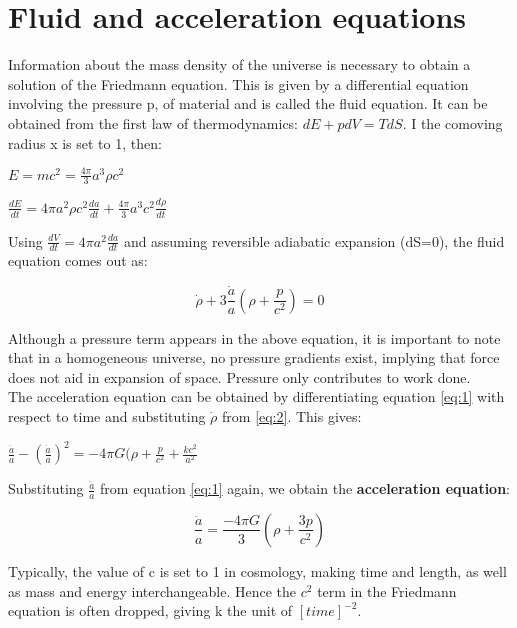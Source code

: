 \documentclass{beamer}
\begin{document}
\section{Fluid and acceleration equations}
\begin{frame}[allowframebreaks]

Information about the mass density of the universe is necessary to obtain a solution of the Friedmann equation. This is given by a differential equation involving the pressure p, of material and is called the fluid equation. It can be obtained from the first law of thermodynamics: $dE+pdV = TdS $. I the comoving radius x is set to 1, then:

\begin{center}
    $E = mc^2 = \frac{4\pi}{3}a^3{\rho}c^2$ \\
\end{center}
    
\begin{center}    
    $\frac{dE}{dt} = 4{\pi}a^2{\rho}c^2\frac{da}{dt}+\frac{4\pi}{3}a^3c^2\frac{d\rho}{dt}$
\end{center}

Using $\frac{dV}{dt} = 4{\pi}a^2\frac{da}{dt}$ and assuming reversible adiabatic expansion (dS=0), the fluid equation comes out as:

\begin{equation} \label{eq:2}
    \dot{\rho}+3\frac{\dot{a}}{a}(\rho+\frac{p}{c^2})=0
\end{equation}

Although a pressure term appears in the above equation, it is important to note that in a homogeneous universe, no pressure gradients exist, implying that force does not aid in expansion of space. Pressure only contributes to work done.
\\
The acceleration equation can be obtained by differentiating equation \ref{eq:1} with respect to time and substituting $\dot{\rho}$ from \ref{eq:2}. This gives:

\begin{center}
    $\frac{\ddot{a}}{a}-(\frac{\dot{a}}{a})^2=-4{\pi}G(\rho+\frac{p}{c^2}+\frac{kc^2}{a^2}$
\end{center}

Substituting $\frac{\ddot{a}}{a}$ from equation \ref{eq:1} again, we obtain the \textbf{acceleration equation}:

\begin{equation}
    \frac{\ddot{a}}{a}=\frac{-4{\pi}G}{3}(\rho+\frac{3p}{c^2})
\end{equation}

Typically, the value of c is set to 1 in cosmology, making time and length, as well as mass and energy interchangeable. Hence the $c^2$ term in the Friedmann equation is often dropped, giving k the unit of $[time]^{-2}$.

\end{frame}
\end{document}
